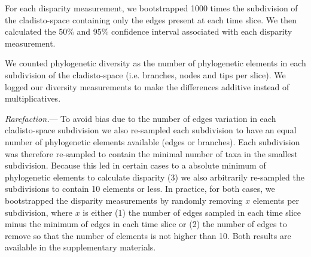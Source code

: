 \documentclass[12pt,letterpaper]{article}
\renewcommand{\subsubsection}[1]{%
\vspace{2ex}
\noindent
\textit{#1.}---}
\begin{document}
For each disparity measurement, we bootstrapped 1000 times the subdivision of the cladisto-space containing only the edges present at each time slice. We then calculated the 50\% and 95\% confidence interval associated with each disparity measurement.

We counted phylogenetic diversity as the number of phylogenetic elements in each subdivision of the cladisto-space (i.e. branches, nodes and tips per slice). We logged our diversity measurements to make the differences additive instead of multiplicatives.


\subsubsection{Rarefaction}
To avoid bias due to the number of edges variation in each cladisto-space subdivision we also re-sampled each subdivision to have an equal number of phylogenetic elements available (edges or branches). Each subdivision was therefore re-sampled to contain the minimal number of taxa in the smallest subdivision. Because this led in certain cases to a absolute minimum of phylogenetic elements to calculate disparity (3) we also arbitrarily re-sampled the subdivisions to contain 10 elements or less. In practice, for both cases, we bootstrapped the disparity measurements by randomly removing $x$ elements per subdivision, where $x$ is either (1) the number of edges sampled in each time slice minus the minimum of edges in each time slice or (2) the number of edges to remove so that the number of elements is not higher than 10. Both results are available in the supplementary materials.
\end{document}
